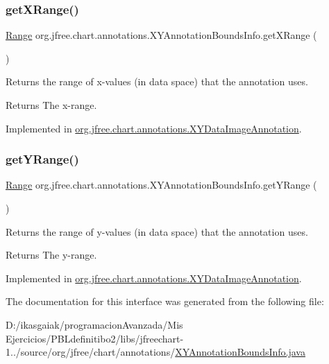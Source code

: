 \subsubsection{\texorpdfstring{get\+X\+Range()}{getXRange()}}
{\footnotesize\ttfamily \mbox{\hyperlink{classorg_1_1jfree_1_1data_1_1_range}{Range}} org.\+jfree.\+chart.\+annotations.\+X\+Y\+Annotation\+Bounds\+Info.\+get\+X\+Range (\begin{DoxyParamCaption}{ }\end{DoxyParamCaption})}

Returns the range of x-\/values (in data space) that the annotation uses.

\begin{DoxyReturn}{Returns}
The x-\/range. 
\end{DoxyReturn}


Implemented in \mbox{\hyperlink{classorg_1_1jfree_1_1chart_1_1annotations_1_1_x_y_data_image_annotation_a62369979a4929b029c8dd82b98f98760}{org.\+jfree.\+chart.\+annotations.\+X\+Y\+Data\+Image\+Annotation}}.

\mbox{\label{interfaceorg_1_1jfree_1_1chart_1_1annotations_1_1_x_y_annotation_bounds_info_ac2b862c20ed8685be1b5c445abdf2f00}} 
\subsubsection{\texorpdfstring{get\+Y\+Range()}{getYRange()}}
{\footnotesize\ttfamily \mbox{\hyperlink{classorg_1_1jfree_1_1data_1_1_range}{Range}} org.\+jfree.\+chart.\+annotations.\+X\+Y\+Annotation\+Bounds\+Info.\+get\+Y\+Range (\begin{DoxyParamCaption}{ }\end{DoxyParamCaption})}

Returns the range of y-\/values (in data space) that the annotation uses.

\begin{DoxyReturn}{Returns}
The y-\/range. 
\end{DoxyReturn}


Implemented in \mbox{\hyperlink{classorg_1_1jfree_1_1chart_1_1annotations_1_1_x_y_data_image_annotation_ad202fa771cea47d7b5b141e76a198c06}{org.\+jfree.\+chart.\+annotations.\+X\+Y\+Data\+Image\+Annotation}}.



The documentation for this interface was generated from the following file\+:\begin{DoxyCompactItemize}
\item 
D\+:/ikasgaiak/programacion\+Avanzada/\+Mis Ejercicios/\+P\+B\+Ldefinitibo2/libs/jfreechart-\/1../source/org/jfree/chart/annotations/\mbox{\hyperlink{_x_y_annotation_bounds_info_8java}{X\+Y\+Annotation\+Bounds\+Info.\+java}}\end{DoxyCompactItemize}
